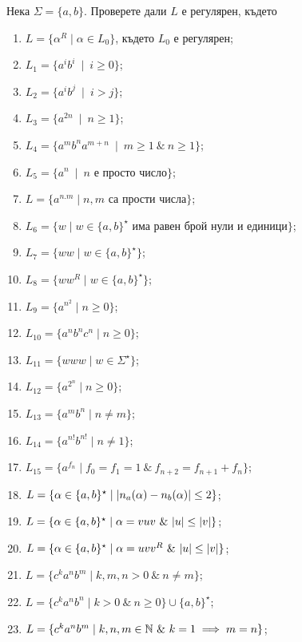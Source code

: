 \begin{problem}
  Нека $\Sigma = \{a,b\}$.  Проверете дали $L$ е регулярен, където
  \begin{enumerate}[1)]
  \item
    $L = \{\alpha^R \mid \alpha \in L_0\}$, където $L_0$ е регулярен;
  \item
    $L_1 = \{a^ib^i\ \mid\ i\geq 0\}$;
  \item
    $L_2 = \{a^ib^j\ \mid\ i > j\}$;
  \item
    $L_3 = \{a^{2n}\ \mid\ n\geq 1\}$;
  \item
    $L_4 = \{a^mb^na^{m+n}\ \mid\ m\geq 1\ \&\ n\geq 1\}$;
  \item
    $L_5 = \{a^n\ \mid\ n\mbox{ е просто число}\}$;
  \item
    $L = \{a^{n.m}\mid n,m\mbox{ са прости числа}\}$;
  \item
    $L_6 = \{w\mid w\in\{a,b\}^\star\mbox{ има равен брой нули и единици}\}$;
  \item
    $L_7 = \{ww\mid w\in\{a,b\}^\star\}$;
  \item
    $L_8 = \{ww^R\mid w\in\{a,b\}^\star\}$;
  \item
    $L_9= \{a^{n^2}\mid n\geq 0\}$;
  \item
    $L_{10} = \{a^nb^nc^n\mid n\geq 0\}$;
  \item
    $L_{11} = \{www\mid w\in \Sigma^\star\}$;
  \item
    $L_{12} = \{a^{2^n}\mid n\geq 0\}$;
  \item
    $L_{13} = \{a^mb^n\mid n\neq m\}$;
  \item
    $L_{14} = \{a^{n!}b^{n!}\mid n\neq 1\}$;
  \item
    $L_{15} = \{a^{f_n} \mid f_0 = f_1 = 1\ \&\ f_{n+2} = f_{n+1} + f_{n}\}$;
  \item
    $L = \{\alpha \in \{a,b\}^\star \mid \vert{n_a(\alpha) - n_b(\alpha)}\vert \leq 2\}$;
  \item
    $L = \{\alpha \in \{a,b\}^\star \mid \alpha = vuv\ \&\ \vert{u}\vert \leq \vert{v}\vert\}$;
  \item
    $L = \{\alpha \in \{a,b\}^\star \mid \alpha = uvv^R\ \&\ \vert{u}\vert \leq \vert{v}\vert\}$;
  \item
    $L = \{c^ka^nb^m \mid k,m,n > 0\ \&\ n \neq m\}$;
  \item
    $L = \{c^ka^nb^n \mid k > 0\ \&\ n \geq 0\}\cup\{a,b\}^\star$;
  \item
    $L = \{c^ka^nb^m\mid k,n,m \in \N\ \&\ k = 1\implies m = n\}$; %
  \end{enumerate}
\end{problem}
